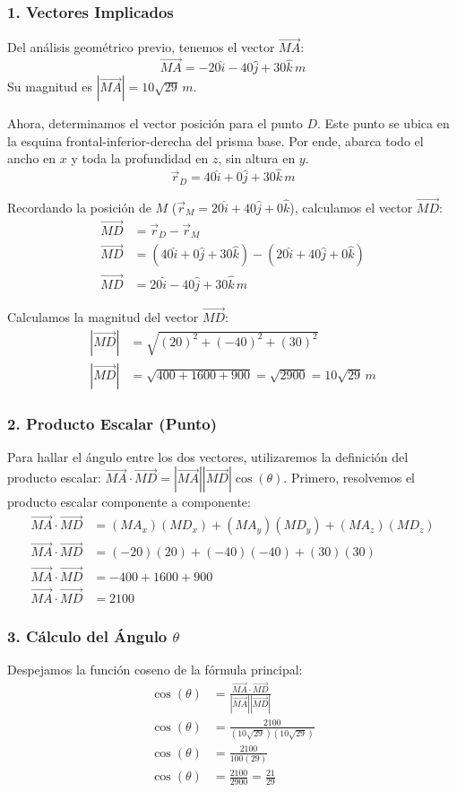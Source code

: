 \documentclass[12pt, a4paper]{article}
\begin{document}
\subsubsection*{1. Vectores Implicados}
Del análisis geométrico previo, tenemos el vector $\vec{MA}$:
$$ \vec{MA} = -20\hat{i} - 40\hat{j} + 30\hat{k} \, \si{m} $$
Su magnitud es $|\vec{MA}| = 10\sqrt{29} \, \si{m}$.

Ahora, determinamos el vector posición para el punto $D$. Este punto se ubica en la esquina frontal-inferior-derecha del prisma base. Por ende, abarca todo el ancho en $x$ y toda la profundidad en $z$, sin altura en $y$.
$$ \vec{r}_D = 40\hat{i} + 0\hat{j} + 30\hat{k} \, \si{m} $$

Recordando la posición de $M$ ($\vec{r}_M = 20\hat{i} + 40\hat{j} + 0\hat{k}$), calculamos el vector $\vec{MD}$:
\begin{align*}
    \vec{MD} &= \vec{r}_D - \vec{r}_M \\
    \vec{MD} &= (40\hat{i} + 0\hat{j} + 30\hat{k}) - (20\hat{i} + 40\hat{j} + 0\hat{k}) \\
    \vec{MD} &= 20\hat{i} - 40\hat{j} + 30\hat{k} \, \si{m}
\end{align*}

Calculamos la magnitud del vector $\vec{MD}$:
\begin{align*}
    |\vec{MD}| &= \sqrt{(20)^2 + (-40)^2 + (30)^2} \\
    |\vec{MD}| &= \sqrt{400 + 1600 + 900} = \sqrt{2900} = 10\sqrt{29} \, \si{m}
\end{align*}

\subsubsection*{2. Producto Escalar (Punto)}
Para hallar el ángulo entre los dos vectores, utilizaremos la definición del producto escalar: $\vec{MA} \cdot \vec{MD} = |\vec{MA}||\vec{MD}|\cos(\theta)$.
Primero, resolvemos el producto escalar componente a componente:
\begin{align*}
    \vec{MA} \cdot \vec{MD} &= (MA_x)(MD_x) + (MA_y)(MD_y) + (MA_z)(MD_z) \\
    \vec{MA} \cdot \vec{MD} &= (-20)(20) + (-40)(-40) + (30)(30) \\
    \vec{MA} \cdot \vec{MD} &= -400 + 1600 + 900 \\
    \vec{MA} \cdot \vec{MD} &= 2100
\end{align*}

\subsubsection*{3. Cálculo del Ángulo $\theta$}
Despejamos la función coseno de la fórmula principal:
\begin{align*}
    \cos(\theta) &= \frac{\vec{MA} \cdot \vec{MD}}{|\vec{MA}||\vec{MD}|} \\
    \cos(\theta) &= \frac{2100}{(10\sqrt{29})(10\sqrt{29})} \\
    \cos(\theta) &= \frac{2100}{100(29)} \\
    \cos(\theta) &= \frac{2100}{2900} = \frac{21}{29}
\end{align*}
\end{document}
